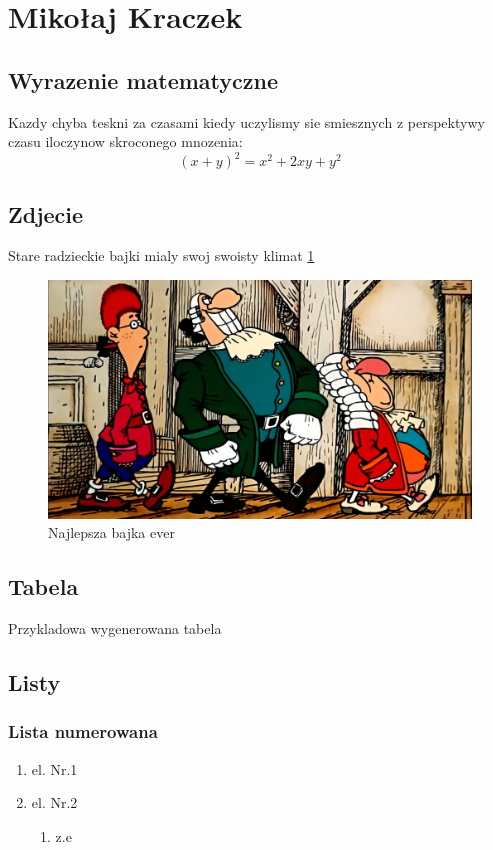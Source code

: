\section{Mikołaj Kraczek}
\label{sec:Mikołaj}

\subsection{Wyrazenie matematyczne}
    Kazdy chyba teskni za czasami kiedy uczylismy sie smiesznych z perspektywy czasu iloczynow skroconego mnozenia: \[(x+y)^2=x^2+2xy+y^2\]
\subsection{Zdjecie}
    Stare radzieckie bajki mialy swoj swoisty klimat \ref{fig:gigachad}
    \begin{figure}[h]
        \centering
        \includegraphics[width=1\textwidth]{pictures/gigachad.jpg}
        \caption{Najlepsza bajka ever}
        \label{fig:gigachad}
    \end{figure}
    \newpage
\subsection{Tabela}
    Przykladowa wygenerowana tabela
    
\subsection{Listy}
    \subsubsection{Lista numerowana}
        \begin{enumerate}
            \item el. Nr.1
            \item el. Nr.2
            \begin{enumerate}
                \item z.e
            \end{enumerate}
        \end{enumerate}
